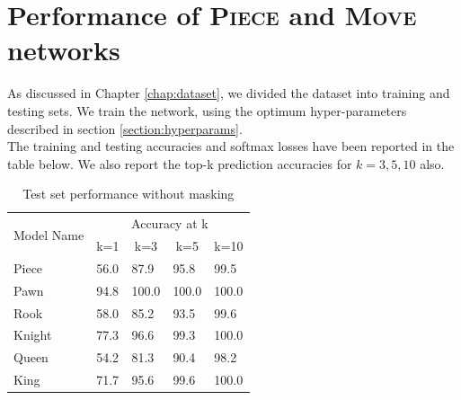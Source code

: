 \section{Performance of \textsc{Piece} and \textsc{Move} networks}
As discussed in Chapter \ref{chap:dataset}, we divided the dataset into training 
and testing sets. We train the network, using the optimum hyper-parameters 
described in section \ref{section:hyperparams}.\\
The training and testing accuracies and softmax losses have been reported in the 
table below. We also report the top-k prediction accuracies for $k=3,5,10$ 
also. 
\begin{table}[H]
\centering
\begin{tabular}{@{}lllll@{}}
\toprule
\multirow{2}{*}{Model Name} & \multicolumn{4}{c}{Accuracy at k}                  
                                                    \\ \cmidrule(l){2-5} 
                            & \multicolumn{1}{c}{k=1} & \multicolumn{1}{c}{k=3} 
& \multicolumn{1}{c}{k=5} & \multicolumn{1}{c}{k=10} \\ \midrule
Piece                       & 56.0                    & 87.9                    
& 95.8                    & 99.5                     \\
Pawn                        & 94.8                    & 100.0                   
& 100.0                   & 100.0                    \\
Rook                        & 58.0                    & 85.2                    
& 93.5                    & 99.6                     \\
Knight                      & 77.3                    & 96.6                    
& 99.3                    & 100.0                    \\
Queen                       & 54.2                    & 81.3                    
& 90.4                    & 98.2                     \\
King                        & 71.7                    & 95.6                    
& 99.6                    & 100.0                    \\ \bottomrule
\end{tabular}
\caption{Test set performance without masking}
\label{table:performance}
\end{table}


